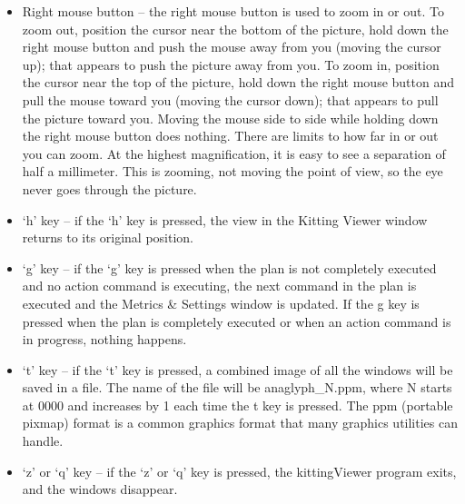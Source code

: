 \begin{itemize}
\item Right mouse button -- the right mouse button is used to zoom in or
  out. To zoom out, position the cursor near the bottom of the picture,
  hold down the right mouse button and push the mouse away from you (moving
  the cursor up); that appears to push the picture away from you. To zoom
  in, position the cursor near the top of the picture, hold down the right
  mouse button and pull the mouse toward you (moving the cursor down); that
  appears to pull the picture toward you. Moving the mouse side to side
  while holding down the right mouse button does nothing. There are limits
  to how far in or out you can zoom. At the highest magnification, it is
  easy to see a separation of half a millimeter. This is zooming, not
  moving the point of view, so the eye never goes through the picture.\\

\item \lq{}h\rq{} key -- if the \lq{}h\rq{} key is pressed, the view in the Kitting Viewer
  window returns to its original position.\\

\item \lq{}g\rq{} key -- if the \lq{}g\rq{} key is pressed when the plan is not completely
  executed and no action command is executing, the next command in the plan
  is executed and the Metrics \& Settings window is updated. If the g key
  is pressed when the plan is completely executed or when an action command
  is in progress, nothing happens.\\

\item \lq{}t\rq{} key -- if the \lq{}t\rq{} key is pressed, a combined image of all the windows
  will be saved in a file. The name of the file will be anaglyph\_N.ppm,
  where N starts at 0000 and increases by 1 each time the t key is
  pressed. The ppm (portable pixmap) format is a common graphics format
  that many graphics utilities can handle.\\

\item \lq{}z\rq{} or \lq{}q\rq{} key -- if the \lq{}z\rq{} or \lq{}q\rq{} key is pressed, the kittingViewer program
  exits, and the windows disappear.\\

\end{itemize}

